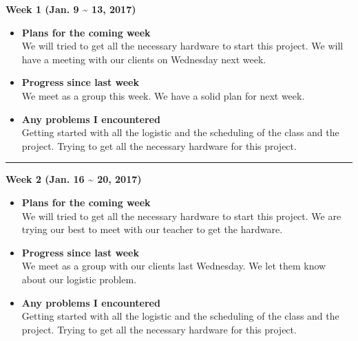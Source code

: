 	\begin{center}
		\textbf{Week 1 (Jan. 9 {\textasciitilde{}} 13, 2017)}
	\end{center}
	\begin{itemize}
		\item \textbf{Plans for the coming week}
		\\We will tried to get all the necessary hardware to start this project. We will have a meeting with our clients on Wednesday next week. \\

		\item \textbf{Progress since last week}
		\\We meet as a group this week. We have a solid plan for next week. \\

		\item \textbf{Any problems I encountered}
		\\Getting started with all the logistic and the scheduling of the class and the project. Trying to get all the necessary hardware for this project.\\
	\end{itemize}

	\rule{\textwidth}{0.5pt}

	\begin{center}
		\textbf{Week 2 (Jan. 16 {\textasciitilde{}} 20, 2017)}
	\end{center}
	\begin{itemize}
		\item \textbf{Plans for the coming week}
		\\We will tried to get all the necessary hardware to start this project. We are trying our best to meet with our teacher to get the hardware. \\

		\item \textbf{Progress since last week}
		\\We meet as a group with our clients last Wednesday. We let them know about our logistic problem. \\

		\item \textbf{Any problems I encountered}
		\\Getting started with all the logistic and the scheduling of the class and the project. Trying to get all the necessary hardware for this project.\\
	\end{itemize}

